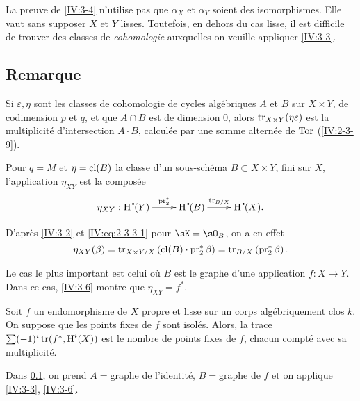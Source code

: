 La preuve de \ref{IV:3-4} n'utilise pas que $\alpha_X$ et $\alpha_Y$ soient des 
isomorphismes. Elle vaut sans supposer $X$ et $Y$ lisses. Toutefois, en dehors 
du cas lisse, il est difficile de trouver des classes de \emph{cohomologie} 
auxquelles on veuille appliquer \ref{IV:3-3}. 





\subsection{Remarque}\label{IV:3-5}

Si $\varepsilon,\eta$ sont les classes de cohomologie de cycles algébriques 
$A$ et $B$ sur $X\times Y$, de codimension $p$ et $q$, et que $A\cap B$ est de 
dimension $0$, alors $\operatorname{tr}_{X\times Y}(\eta\varepsilon)$ est la multiplicité 
d'intersection $A\cdot B$, calculée par une somme alternée de $\operatorname{Tor}$ 
(\ref{IV:2-3-9}). 





\begin{proposition_}\label{IV:3-6}
Pour $q=M$ et $\eta=\operatorname{cl}(B)$ la classe d'un sous-schéma $B\subset X\times Y$, 
fini sur $X$, l'application $\eta_{X Y}$ est la composée 
\[\xymatrix{
  \eta_{X Y} : \h^\bullet(Y) \ar[r]^-{\operatorname{pr}_2^\ast} 
    & \h^\bullet(B) \ar[r]^-{\tr_{B/X}} 
    & \h^\bullet(X) \text{.}
}\]
\end{proposition_}

D'après \ref{IV:3-2} et \eqref{IV:eq:2-3-3-1} pour $\sK=\sO_B$, on a en 
effet 
\[
  \eta_{X Y}(\beta) = \operatorname{tr}_{X\times Y/X}\left(\operatorname{cl}(B)\cdot \operatorname{pr}_2^\ast\beta\right) = \operatorname{tr}_{B/X}\left(\operatorname{pr}_2^\ast \beta\right) \text{.}
\]

Le cas le plus important est celui où $B$ est le graphe d'une application 
$f:X\to Y$. Dans ce cas, \ref{IV:3-6} montre que $\eta_{X Y}=f^\ast$. 





\begin{corollary_}\label{IV:3-7}
Soit $f$ un endomorphisme de $X$ propre et lisse sur un corps algébriquement 
clos $k$. On suppose que les points fixes de $f$ sont isolés. Alors, la 
trace $\sum (-1)^i \operatorname{tr}(f^\ast,\operatorname{H}^i(X))$ est le nombre de points fixes de $f$, 
chacun compté avec sa multiplicité.
\end{corollary_}

Dans \ref{IV:3-5}, on prend $A=$graphe de l'identité, $B=$graphe de $f$ et on 
applique \ref{IV:3-3}, \ref{IV:3-6}. 





